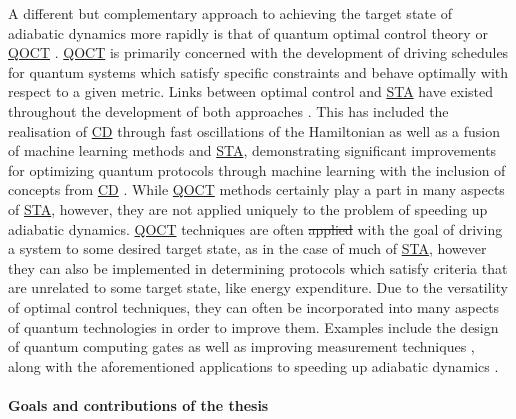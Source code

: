 \documentclass[a4paper,oneside,11pt]{book}
\newcommand{\acrref}[1]{\hyperref[acr:#1]{#1}}
\providecommand{\DIFaddtex}[1]{{\protect\color{blue}\uwave{#1}}} %
\providecommand{\DIFdeltex}[1]{{\protect\color{red}\sout{#1}}}                      %
\providecommand{\DIFaddbegin}{} %
\providecommand{\DIFaddend}{} %
\providecommand{\DIFdelbegin}{} %
\providecommand{\DIFdelend}{} %
\providecommand{\DIFadd}[1]{\texorpdfstring{\DIFaddtex{#1}}{#1}} %
\providecommand{\DIFdel}[1]{\texorpdfstring{\DIFdeltex{#1}}{}} %
\newcommand{\DIFscaledelfig}{0.5}
\newlength{\DIFdelgraphicswidth} %
\newlength{\DIFdelgraphicsheight} %
\newcommand{\DIFaddincludegraphics}[2][]{{\color{blue}\fbox{\DIFOincludegraphics[#1]{#2}}}} %
\newcommand{\DIFdelincludegraphics}[2][]{%
\sbox{\DIFdelgraphicsbox}{\DIFOincludegraphics[#1]{#2}}%
\settoboxwidth{\DIFdelgraphicswidth}{\DIFdelgraphicsbox} %
\settoboxtotalheight{\DIFdelgraphicsheight}{\DIFdelgraphicsbox} %
\scalebox{\DIFscaledelfig}{%
\parbox[b]{\DIFdelgraphicswidth}{\usebox{\DIFdelgraphicsbox}\\[-\baselineskip] \rule{\DIFdelgraphicswidth}{0em}}\llap{\resizebox{\DIFdelgraphicswidth}{\DIFdelgraphicsheight}{%
\setlength{\unitlength}{\DIFdelgraphicswidth}%
\begin{picture}(1,1)%
\thicklines\linethickness{2pt} %
{\color[rgb]{1,0,0}\put(0,0){\framebox(1,1){}}}%
{\color[rgb]{1,0,0}\put(0,0){\line( 1,1){1}}}%
{\color[rgb]{1,0,0}\put(0,1){\line(1,-1){1}}}%
\end{picture}%
}\hspace*{3pt}}} %
} %
\DeclareRobustCommand{\DIFaddbegin}{\DIFOaddbegin \let\includegraphics\DIFaddincludegraphics} %
\DeclareRobustCommand{\DIFaddend}{\DIFOaddend \let\includegraphics\DIFOincludegraphics} %
\DeclareRobustCommand{\DIFdelbegin}{\DIFOdelbegin \let\includegraphics\DIFdelincludegraphics} %
\DeclareRobustCommand{\DIFdelend}{\DIFOaddend \let\includegraphics\DIFOincludegraphics} %
\begin{document}
A different but complementary approach to achieving the target state of adiabatic dynamics more rapidly is that of quantum optimal control theory or \acrref{QOCT} \cite{glaser_training_2015, koch_quantum_2022}. \acrref{QOCT} is primarily concerned with the development of driving schedules for quantum systems which satisfy specific constraints and behave optimally with respect to a given metric. Links between optimal control and \acrref{STA} have existed throughout the development of both approaches \cite{stefanatos_frictionless_2010, stefanatos_shortcut_2021, zhang_connection_2021}. This has included the realisation of \acrref{CD} through fast oscillations of the Hamiltonian \cite{petiziol_accelerated_2020, petiziol_fast_2018} as well as a fusion of machine learning methods and \acrref{STA}, demonstrating significant improvements for optimizing quantum protocols through machine learning with the inclusion of concepts from \acrref{CD} \cite{bukov_reinforcement_2018, yao_reinforcement_2021, khait_optimal_2022}. While \acrref{QOCT} methods certainly play a part in many aspects of \acrref{STA}, however, they are not applied uniquely to the problem of speeding up adiabatic dynamics. \acrref{QOCT} techniques are often \DIFdelbegin \DIFdel{applied }\DIFdelend \DIFaddbegin \DIFadd{implemented }\DIFaddend with the goal of driving a system to some desired target state, as in the case of much of \acrref{STA}, however they can also be implemented in determining protocols which satisfy criteria that are unrelated to some target state, like \DIFaddbegin \DIFadd{minimising the magnitude of }\DIFaddend energy expenditure. Due to the versatility of optimal control techniques, they can often be incorporated into many aspects of quantum technologies in order to improve them. Examples include the design of quantum computing gates \cite{pelegri_high-fidelity_2022} as well as improving measurement techniques \cite{wiseman_quantum_2009}, along with the aforementioned applications to speeding up adiabatic dynamics \cite{guery-odelin_shortcuts_2019}.


\paragraph*{Goals and contributions of the thesis}
\end{document}
